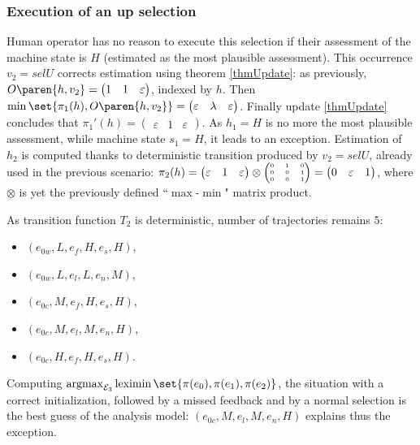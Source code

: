 \subsubsection{Execution of an up selection}
Human operator has no reason to execute this selection if 
their assessment of the machine state is $H$
(estimated as the most plausible assessment). This occurrence 
$v_2 = selU$ corrects estimation using theorem \ref{thmUpdate}:
as previously, $O \paren{ h, v_2 } = \begin{pmatrix} 1 & 1 & \varepsilon \end{pmatrix} $, indexed by $h$. 
Then $\min \set{ \pi_1 (h) , O \paren{ h, v_2 }} = \begin{pmatrix} \varepsilon & \lambda & \varepsilon \end{pmatrix}$.
Finally update \ref{thmUpdate} concludes that $\pi_1'(h) = \begin{pmatrix} \varepsilon & 1 & \varepsilon \end{pmatrix}$. 
As $h_1=H$ is no more the most plausible assessment, while machine state $s_1=H$, 
it leads to an exception.
Estimation of $h_2$ is computed thanks to deterministic transition produced by $v_2= selU$, already used in the previous scenario:
$\pi_2(h) = \begin{pmatrix} \varepsilon & 1 & \varepsilon \end{pmatrix} 
\otimes \tiny \begin{pmatrix} 0 & 1 & 0 \\ 0 & 0 & 1 \\ 0 & 0 & 1 \end{pmatrix} \normalsize 
= \begin{pmatrix} 0 & \varepsilon & 1 \end{pmatrix}$, 
where $\otimes$ is yet the previously defined ``$\max$-$\min$" matrix product.

As transition function $T_2$ is deterministic, number of trajectories remains $5$: 
\begin{itemize}
\item $(e_{0w},L,e_f,H,e_s,H)$, 
\item $(e_{0w},L,e_l,L,e_n,M)$, 
\item $(e_{0c},M,e_f,H,e_s,H)$, 
\item $(e_{0c},M,e_l,M,e_n,H)$, 
\item $(e_{0c},H,e_f,H,e_s,H)$.
\end{itemize}
Computing $\operatorname*{argmax}_{\mathcal{E}_3}\operatorname*{leximin} \set{ \pi(e_0),\pi(e_1),\pi(e_2) }$, 
the situation with a correct initialization, 
followed by a missed feedback 
and by a normal selection 
is the best guess of the analysis model: 
$(e_{0c},M,e_l,M,e_n,H)$ explains thus the exception. \\

